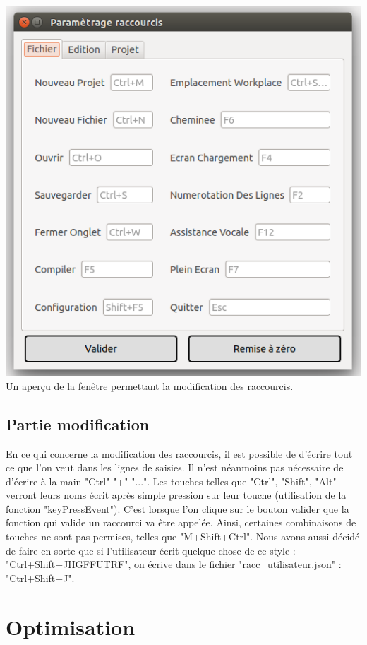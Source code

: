 \documentclass[a4paper,12pt]{article}
\begin{document}
\begin{center}
	\includegraphics[scale=0.4]{images/imgs_racc/ex_2.png}\\
	Un aperçu de la fenêtre permettant la modification des raccourcis.
\end{center}

	\subsection{Partie modification}

En ce qui concerne la modification des raccourcis, il est possible de d'écrire tout ce que l'on veut dans les lignes de saisies.
Il n'est néanmoins pas nécessaire de d'écrire à la main "Ctrl" "+" "...". Les touches telles que "Ctrl", "Shift", "Alt" verront leurs noms écrit après simple pression sur leur touche (utilisation de la fonction "keyPressEvent").
C'est lorsque l'on clique sur le bouton valider que la fonction qui valide un raccourci va être appelée. Ainsi, certaines combinaisons de touches ne sont pas permises, telles que "M+Shift+Ctrl". Nous avons aussi décidé de faire en sorte que si l'utilisateur écrit quelque chose de ce style : "Ctrl+Shift+JHGFFUTRF", on écrive dans le fichier "racc\_utilisateur.json" : "Ctrl+Shift+J".

\section{Optimisation}
\end{document}
